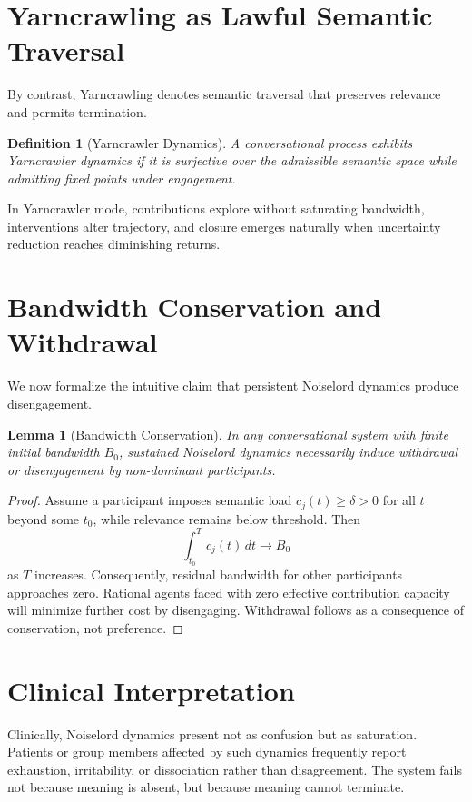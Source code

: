 \documentclass[12pt]{article}
\newtheorem{lemma}[theorem]{Lemma}
\newtheorem{definition}[theorem]{Definition}
\theoremstyle{remark}
\begin{document}
\section{Yarncrawling as Lawful Semantic Traversal}

By contrast, Yarncrawling denotes semantic traversal that preserves relevance and permits termination.

\begin{definition}[Yarncrawler Dynamics]
A conversational process exhibits Yarncrawler dynamics if it is surjective over the admissible semantic space while admitting fixed points under engagement.
\end{definition}

In Yarncrawler mode, contributions explore without saturating bandwidth, interventions alter trajectory, and closure emerges naturally when uncertainty reduction reaches diminishing returns.

\section{Bandwidth Conservation and Withdrawal}

We now formalize the intuitive claim that persistent Noiselord dynamics produce disengagement.

\begin{lemma}[Bandwidth Conservation]
In any conversational system with finite initial bandwidth $B_0$, sustained Noiselord dynamics necessarily induce withdrawal or disengagement by non-dominant participants.
\end{lemma}

\begin{proof}
Assume a participant imposes semantic load $c_j(t) \geq \delta > 0$ for all $t$ beyond some $t_0$, while relevance remains below threshold. Then
\[
\int_{t_0}^{T} c_j(t)\, dt \to B_0
\]
as $T$ increases. Consequently, residual bandwidth for other participants approaches zero. Rational agents faced with zero effective contribution capacity will minimize further cost by disengaging. Withdrawal follows as a consequence of conservation, not preference.
\end{proof}

\section{Clinical Interpretation}

Clinically, Noiselord dynamics present not as confusion but as saturation. Patients or group members affected by such dynamics frequently report exhaustion, irritability, or dissociation rather than disagreement. The system fails not because meaning is absent, but because meaning cannot terminate.
\end{document}
